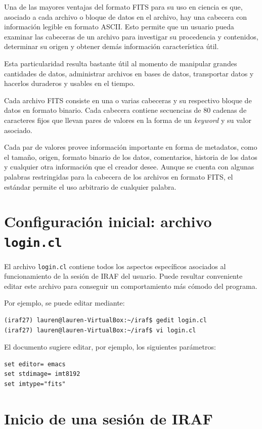 Una de las mayores ventajas del formato FITS para su uso en ciencia es que, asociado a cada archivo o bloque de datos en el archivo, hay una cabecera con información legible en formato ASCII. Esto permite que un usuario pueda examinar las cabeceras de un archivo para investigar su procedencia y contenidos, determinar su origen y obtener demás información característica útil.

Esta particularidad resulta bastante útil al momento de manipular grandes cantidades de datos, administrar archivos en bases de datos, transportar datos y hacerlos duraderos y usables en el tiempo.

Cada archivo FITS consiste en una o varias cabeceras y su respectivo bloque de datos en formato binario. Cada cabecera contiene secuencias de 80 cadenas de caracteres fijos que llevan pares de valores en la forma de un \textit{keyword} y su valor asociado.

Cada par de valores provee información importante en forma de metadatos, como el tamaño, origen, formato binario de los datos, comentarios, historia de los datos y cualquier otra información que el creador desee. Aunque se cuenta con algunas palabras restringidas para la cabecera de los archivos en formato FITS, el estándar permite el uso arbitrario de cualquier palabra.

\section{Configuración inicial: archivo \texttt{login.cl}}

El archivo \texttt{login.cl} contiene todos los aspectos específicos asociados al funcionamiento de la sesión de IRAF del usuario. Puede resultar conveniente editar este archivo para conseguir un comportamiento más cómodo del programa.

Por ejemplo, se puede editar mediante:

\begin{verbatim}
(iraf27) lauren@lauren-VirtualBox:~/iraf$ gedit login.cl
(iraf27) lauren@lauren-VirtualBox:~/iraf$ vi login.cl
\end{verbatim}

El documento sugiere editar, por ejemplo, los siguientes parámetros:

\begin{verbatim}
set editor= emacs
set stdimage= imt8192
set imtype="fits"
\end{verbatim}

\section{Inicio de una sesión de IRAF}

